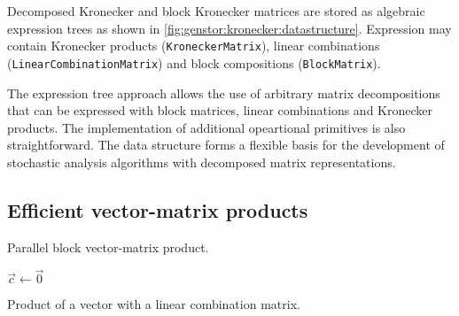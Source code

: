 Decomposed Kronecker and block Kronecker matrices are stored as
algebraic expression trees as shown in
\cref{fig:genstor:kronecker:datastructure}. Expression may contain
Kronecker products (\texttt{KroneckerMatrix}), linear combinations
(\texttt{LinearCombinationMatrix}) and block compositions
(\texttt{BlockMatrix}).

The expression tree approach allows the use of arbitrary matrix
decompositions that can be expressed with block matrices, linear
combinations and Kronecker products. The implementation of additional
opeartional primitives is also straightforward. The data structure
forms a flexible basis for the development of stochastic analysis
algorithms with decomposed matrix representations.

\subsection{Efficient vector-matrix products}
\label{sec:algorithms:vector-matrix}

\begin{algorithm}
  \;
  \caption{Parallel block vector-matrix product.}
  \label{alg:algorithms:matmul:block}
\end{algorithm}

\begin{algorithm}
  \;
  $\vec{c} \gets \vec{0}$\;
  \;
  \caption{Product of a vector with a linear combination matrix.}
  \label{alg:algorithms:matmul:lincomb}
\end{algorithm}

